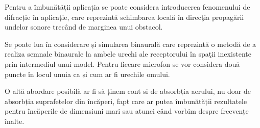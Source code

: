 	Pentru a îmbunătății aplicația se poate considera introducerea fenomenului de difracție în aplicație, care reprezint\u{a} schimbarea local\u{a} \^{i}n direc\c{t}ia propag\u{a}rii undelor sonore trec\^{a}nd de marginea unui obstacol.
	
	Se poate lua în considerare și simularea binaurală care reprezint\u{a} o metod\u{a} de a realiza semnale binaurale la ambele urechi ale receptorului \^{i}n spa\c{t}ii inexistente prin intermediul unui model. Pentru fiecare microfon se vor considera două puncte în locul unuia ca și cum ar fi urechile omului.
	
	O altă abordare posibilă ar fi să ținem cont si de absorbția aerului, nu doar de absorbția suprafețelor din încăperi, fapt care ar putea îmbunătății rezultatele pentru încăperile de dimensiuni mari sau atunci când vorbim despre frecvențe înalte. 
	